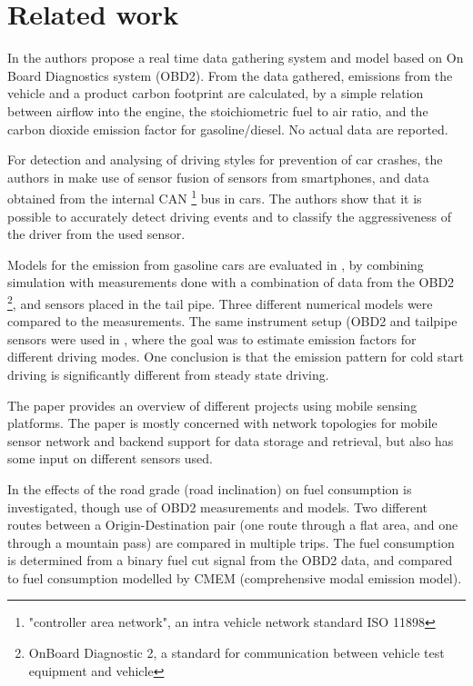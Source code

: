 \section{Related work}
In \cite{hilpert201} the authors propose a real time data gathering system and model based on On Board Diagnostics system (OBD2). From the data gathered, emissions from the vehicle and a product carbon footprint are calculated, by a simple relation between airflow into the engine, the stoichiometric fuel to air ratio, and the carbon dioxide emission factor for gasoline/diesel. No actual data are reported.

For detection and analysing of driving styles for prevention of car crashes, the authors in \cite{Johnson2011} make use of sensor fusion of sensors from smartphones, and data obtained from the internal CAN \footnote{"controller area network", an intra vehicle network standard ISO 11898} bus in cars. The authors show that it is possible to accurately detect driving events and to classify the aggressiveness of the driver from the used sensor.

Models for the emission from gasoline cars are evaluated in \cite{Silva2006}, by combining simulation with measurements done with a combination of data from the OBD2 \footnote{OnBoard Diagnostic 2, a standard for communication between vehicle test equipment and vehicle}, and sensors placed in the tail pipe. Three different numerical models were compared to the measurements. The same instrument setup (OBD2 and tailpipe sensors were used in \cite{Frey}, where the goal was to estimate emission factors for different driving modes. One conclusion is that the emission pattern for cold start driving is significantly different from steady state driving.

The paper \cite{Lee2010} provides an overview of different projects using mobile sensing platforms. The paper is mostly concerned with network topologies for mobile sensor network and backend support for data storage and retrieval, but also has some input on different sensors used.

In \cite{Boriboon} the effects of the road grade (road inclination) on fuel consumption is investigated, though use of OBD2 measurements and models. Two different routes between a Origin-Destination pair (one route through a flat area, and one through a mountain pass) are compared in multiple trips. The fuel consumption is determined from a binary fuel cut signal from the OBD2 data, and compared to fuel consumption modelled by CMEM (comprehensive modal emission model). 

